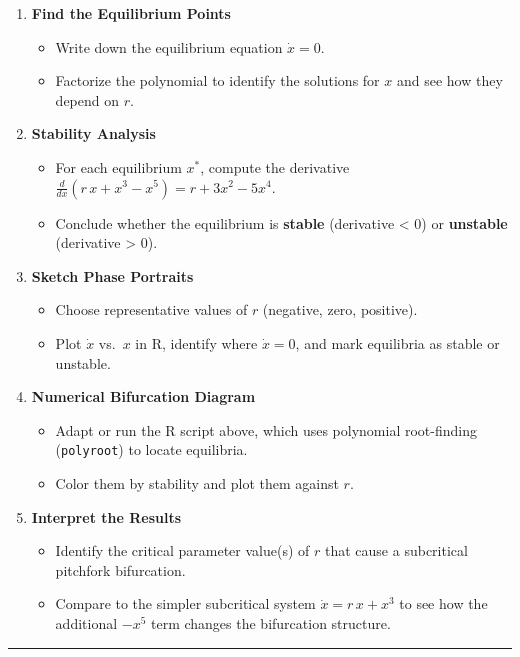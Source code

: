 \documentclass[
]{article}
\providecommand{\tightlist}{%
  \setlength{\itemsep}{0pt}\setlength{\parskip}{0pt}}
\begin{document}
\begin{enumerate}
\def\labelenumi{\arabic{enumi}.}
\tightlist
\item
  \textbf{Find the Equilibrium Points}

  \begin{itemize}
  \tightlist
  \item
    Write down the equilibrium equation \(\dot{x} = 0\).\\
  \item
    Factorize the polynomial to identify the solutions for \(x\) and see
    how they depend on \(r\).
  \end{itemize}
\item
  \textbf{Stability Analysis}

  \begin{itemize}
  \tightlist
  \item
    For each equilibrium \(x^*\), compute the derivative
    \(\frac{d}{dx}(r\,x + x^3 - x^5) = r + 3x^2 - 5x^4\).\\
  \item
    Conclude whether the equilibrium is \textbf{stable} (derivative
    \textless{} 0) or \textbf{unstable} (derivative \textgreater{} 0).
  \end{itemize}
\item
  \textbf{Sketch Phase Portraits}

  \begin{itemize}
  \tightlist
  \item
    Choose representative values of \(r\) (negative, zero, positive).\\
  \item
    Plot \(\dot{x}\) vs.~\(x\) in R, identify where \(\dot{x} = 0\), and
    mark equilibria as stable or unstable.
  \end{itemize}
\item
  \textbf{Numerical Bifurcation Diagram}

  \begin{itemize}
  \tightlist
  \item
    Adapt or run the R script above, which uses polynomial root-finding
    (\texttt{polyroot}) to locate equilibria.\\
  \item
    Color them by stability and plot them against \(r\).
  \end{itemize}
\item
  \textbf{Interpret the Results}

  \begin{itemize}
  \tightlist
  \item
    Identify the critical parameter value(s) of \(r\) that cause a
    subcritical pitchfork bifurcation.\\
  \item
    Compare to the simpler subcritical system \(\dot{x} = r\,x + x^3\)
    to see how the additional \(-x^5\) term changes the bifurcation
    structure.
  \end{itemize}
\end{enumerate}

\begin{center}\rule{0.5\linewidth}{0.5pt}\end{center}
\end{document}
